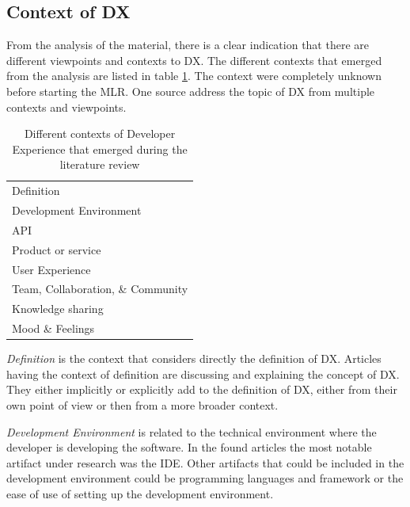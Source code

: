 \documentclass[english, 12pt, a4paper, sci, utf8, a-1b, online]{aaltothesis}
\begin{document}
\subsection{Context of DX}

From the analysis of the material, there is a clear indication that there are different viewpoints and contexts to DX. The different contexts that emerged from the analysis are listed in table \ref{table:contexts}. The context were completely unknown before starting the MLR. One source address the topic of DX from multiple contexts and viewpoints.

\begin{table}[ht]
  \begin{center}
    \begin{tabular}{l}
      \hline
      Definition                        \\
      Development Environment           \\
      API                               \\
      Product or service                \\
      User Experience                   \\
      Team, Collaboration, \& Community \\
      Knowledge sharing                 \\
      Mood \& Feelings                  \\
      \hline
    \end{tabular}
    \captionsetup{width=0.6\textwidth}
    \caption{Different contexts of Developer Experience that emerged during the literature review}
    \label{table:contexts}
  \end{center}
\end{table}

\textit{Definition} is the context that considers directly the definition of DX. Articles having the context of definition are discussing and explaining the concept of DX. They either implicitly or explicitly add to the definition of DX, either from their own point of view or then from a more broader context.

\textit{Development Environment} is related to the technical environment where the developer is developing the software. In the found articles the most notable artifact under research was the IDE. Other artifacts that could be included in the development environment could be programming languages and framework or the ease of use of setting up the development environment.
\end{document}
